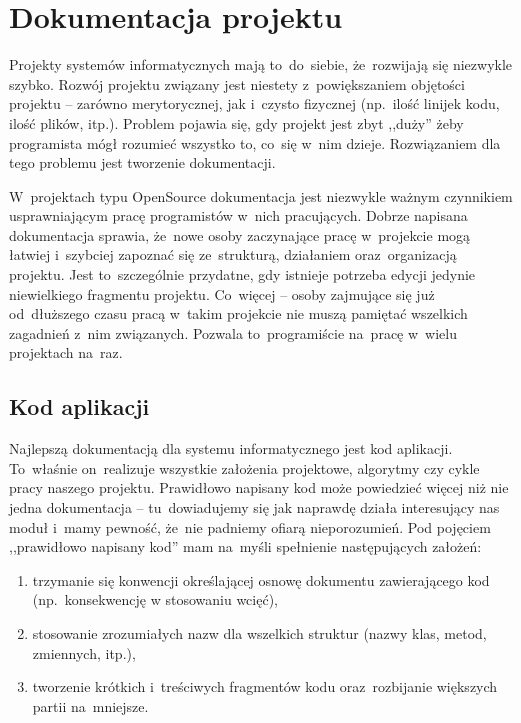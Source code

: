 \section{Dokumentacja projektu} \label{dokumentacja}

Projekty systemów informatycznych mają to~do~siebie, że~rozwijają się niezwykle szybko. Rozwój projektu związany jest niestety z~powiększaniem objętości projektu -- zarówno merytorycznej, jak i~czysto fizycznej (np.~ilość linijek kodu, ilość plików, itp.). Problem pojawia się, gdy projekt jest zbyt ,,duży'' żeby programista mógł rozumieć wszystko to, co~się w~nim dzieje. Rozwiązaniem dla tego problemu jest tworzenie dokumentacji.


W~projektach typu OpenSource dokumentacja jest niezwykle ważnym czynnikiem usprawniającym pracę programistów w~nich pracujących. Dobrze napisana dokumentacja sprawia, że~nowe osoby zaczynające pracę w~projekcie mogą łatwiej i~szybciej zapoznać się ze~strukturą, działaniem oraz~organizacją projektu. Jest to~szczególnie przydatne, gdy istnieje potrzeba edycji jedynie niewielkiego fragmentu projektu. Co~więcej -- osoby zajmujące się już od~dłuższego czasu pracą w~takim projekcie nie muszą pamiętać wszelkich zagadnień z~nim związanych. Pozwala to~programiście na~pracę w~wielu projektach na~raz.


\subsection{Kod aplikacji} \label{dokumentacja.kod}

Najlepszą dokumentacją dla systemu informatycznego jest kod aplikacji. To~właśnie on~realizuje wszystkie założenia projektowe, algorytmy czy cykle pracy naszego projektu. Prawidłowo napisany kod może powiedzieć więcej niż nie jedna dokumentacja -- tu~dowiadujemy się jak naprawdę działa interesujący nas moduł i~mamy pewność, że~nie padniemy ofiarą nieporozumień. Pod pojęciem ,,prawidłowo napisany kod'' mam na~myśli spełnienie następujących założeń:

\begin{enumerate}
  \item trzymanie się konwencji określającej osnowę dokumentu zawierającego kod (np.~konsekwencję w stosowaniu wcięć),
  \item stosowanie zrozumiałych nazw dla wszelkich struktur (nazwy klas, metod, zmiennych, itp.),
  \item tworzenie krótkich i~treściwych fragmentów kodu oraz~rozbijanie większych partii na~mniejsze.
\end{enumerate}

